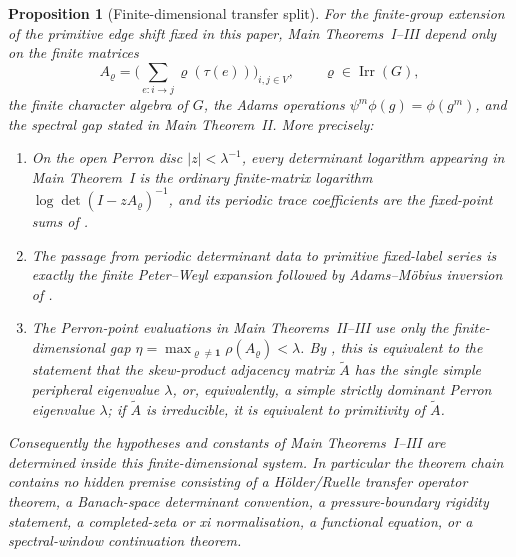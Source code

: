 \documentclass[11pt,a4paper]{amsart}
\theoremstyle{plain}
\newtheorem{proposition}[theorem]{Proposition}
\theoremstyle{definition}
\theoremstyle{remark}
\DeclareMathOperator{\Irr}{Irr}
\begin{document}
\begin{proposition}[Finite-dimensional transfer split]
  \label{prop:intro-finite-state-transfer-split}
  For the finite-group extension of the primitive edge shift fixed in this
  paper, Main Theorems~I--III depend only on the finite matrices
  \[
    A_\varrho=\bigl(\sum_{e:i\to j}\varrho(\tau(e))\bigr)_{i,j\in V},
    \qquad \varrho\in\Irr(G),
  \]
  the finite character algebra of \(G\), the Adams operations
  \(\psi^m\phi(g)=\phi(g^m)\), and the spectral gap stated in Main
  Theorem~II.  More precisely:
  \begin{enumerate}[label=\rm(\alph*)]
  \item On the open Perron disc \(|z|<\lambda^{-1}\), every determinant
    logarithm appearing in Main Theorem~I is the ordinary finite-matrix
    logarithm \(\log\det(I-zA_\varrho)^{-1}\), and its periodic trace
    coefficients are the fixed-point sums of
    .
  \item The passage from periodic determinant data to primitive
    fixed-label series is exactly the finite Peter--Weyl expansion followed
    by Adams--M\"obius inversion of
    .
  \item The Perron-point evaluations in Main Theorems~II--III use only the
    finite-dimensional gap
    \(\eta=\max_{\varrho\ne\mathbf1}\rho(A_\varrho)<\lambda\). By
    , this is equivalent to
    the statement that the skew-product adjacency matrix \(\widetilde A\)
    has the single simple peripheral eigenvalue \(\lambda\), or,
    equivalently, a simple strictly dominant Perron eigenvalue
    \(\lambda\); if \(\widetilde A\) is irreducible, it is equivalent to
    primitivity of \(\widetilde A\).
  \end{enumerate}
  Consequently the hypotheses and constants of Main Theorems~I--III are
  determined inside this finite-dimensional system.  In particular the theorem
  chain contains no hidden premise consisting of a H\"older/Ruelle transfer
  operator theorem, a Banach-space determinant convention, a pressure-boundary
  rigidity statement, a completed-zeta or xi normalisation, a functional
  equation, or a spectral-window continuation theorem.
\end{proposition}
\end{document}
